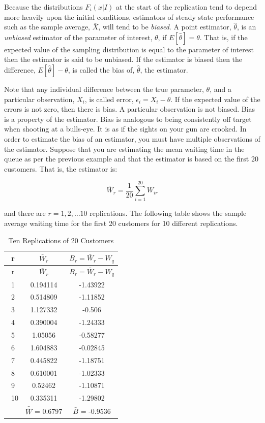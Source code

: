 \documentclass[
]{book}
\theoremstyle{definition}
\theoremstyle{definition}
\theoremstyle{definition}
\theoremstyle{definition}
\theoremstyle{remark}
\begin{document}
Because the distributions \(F_i(x|I)\) at the start of the replication
tend to depend more heavily upon the initial conditions, estimators of
steady state performance such as the sample average, \(\bar{X}\), will
tend to be \emph{biased}. A point estimator, \(\hat{\theta}\), is an \emph{unbiased}
estimator of the parameter of interest, \(\theta\), if
\(E[\hat{\theta}] = \theta\). That is, if the expected value of the
sampling distribution is equal to the parameter of interest then the
estimator is said to be unbiased. If the estimator is biased then the
difference, \(E[\hat{\theta}] - \theta\), is called the bias of,
\(\hat{\theta}\), the estimator.

Note that any individual difference between the true parameter,
\(\theta\), and a particular observation, \(X_i\), is called error,
\(\epsilon_i = X_i -\theta\). If the expected value of the errors is not
zero, then there is bias. A particular observation is not biased. Bias
is a property of the estimator. Bias is analogous to being consistently
off target when shooting at a bulls-eye. It is as if the sights on your
gun are crooked. In order to estimate the bias of an estimator, you must
have multiple observations of the estimator. Suppose that you are
estimating the mean waiting time in the queue as per the previous
example and that the estimator is based on the first 20 customers. That
is, the estimator is:

\[\bar{W}_r = \dfrac{1}{20}\sum_{i=1}^{20} W_{ir}\]

and there are \(r = 1, 2, \ldots 10\) replications.
The following table shows the sample average waiting time for the
first 20 customers for 10 different replications.

\begin{longtable}[]{@{}ccc@{}}
\caption{Ten Replications of 20 Customers}\tabularnewline
\toprule
r & \(\bar{W}_r\) & \(B_r = \bar{W}_r - W_q\) \\
\midrule
\endfirsthead
\toprule
r & \(\bar{W}_r\) & \(B_r = \bar{W}_r - W_q\) \\
\midrule
\endhead
1 & 0.194114 & -1.43922 \\
2 & 0.514809 & -1.11852 \\
3 & 1.127332 & -0.506 \\
4 & 0.390004 & -1.24333 \\
5 & 1.05056 & -0.58277 \\
6 & 1.604883 & -0.02845 \\
7 & 0.445822 & -1.18751 \\
8 & 0.610001 & -1.02333 \\
9 & 0.52462 & -1.10871 \\
~10 & 0.335311 & -1.29802 \\
& \(\bar{\bar{W}}\) = 0.6797 & \(\bar{B}\) = -0.9536 \\
\bottomrule
\end{longtable}
\end{document}
